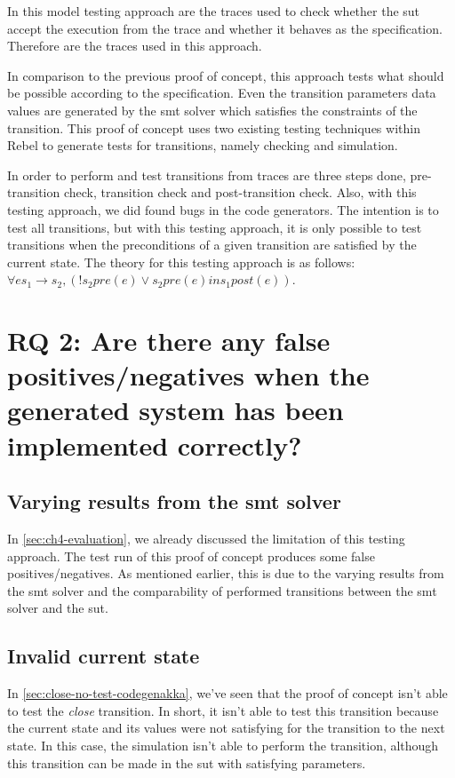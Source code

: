 In this model testing approach are the traces used to check whether the \gls{sut} accept the execution from the trace and whether it behaves as the specification. Therefore are the traces used in this approach.

In comparison to the previous proof of concept, this approach tests what should be possible according to the specification. Even the transition parameters data values are generated by the \gls{smt} solver which satisfies the constraints of the transition. This proof of concept uses two existing testing techniques within Rebel to generate tests for transitions, namely checking and simulation.

In order to perform and test transitions from traces are three steps done, pre-transition check, transition check and post-transition check. Also, with this testing approach, we did found bugs in the code generators. The intention is to test all transitions, but with this testing approach, it is only possible to test transitions when the preconditions of a given transition are satisfied by the current state. The theory for this testing approach is as follows: $\forall e s_{1} \to s_{2}, (! s_{2} pre(e) \lor s_{2} pre(e) in s_{1} post(e))$.

\section{RQ 2: Are there any false positives/negatives when the generated system has been implemented correctly?}

\subsection{Varying results from the \gls{smt} solver}
In \autoref{sec:ch4-evaluation}, we already discussed the limitation of this testing approach. The test run of this proof of concept produces some false positives/negatives. As mentioned earlier, this is due to the varying results from the \gls{smt} solver and the comparability of performed transitions between the \gls{smt} solver and the \gls{sut}.


\subsection{Invalid current state}
In \autoref{sec:close-no-test-codegenakka}, we've seen that the proof of concept isn't able to test the \textit{close} transition. In short, it isn't able to test this transition because the current state and its values were not satisfying for the transition to the next state. In this case, the simulation isn't able to perform the transition, although this transition can be made in the \gls{sut} with satisfying parameters.

